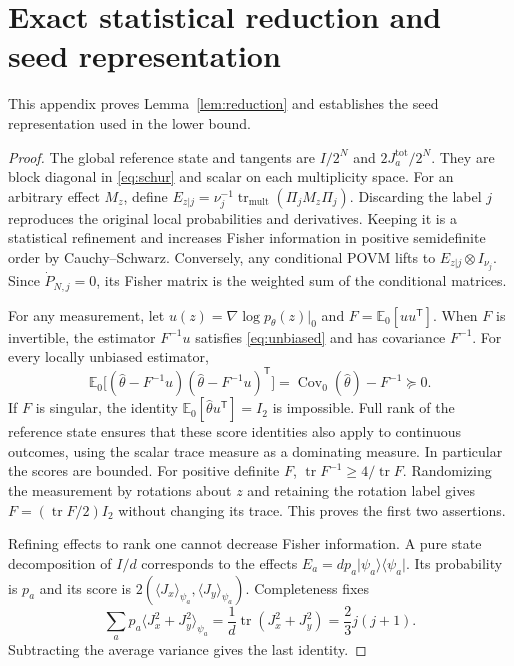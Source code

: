 \documentclass[aps,pra,reprint,superscriptaddress]{revtex4-2}
\theoremstyle{remark}
\DeclareMathOperator{\tr}{tr}
\DeclareMathOperator{\Cov}{Cov}
\newcommand{\E}{\mathbb E}
\newcommand{\ket}[1]{\lvert#1\rangle}
\newcommand{\bra}[1]{\langle#1\rvert}
\newcommand{\ip}[1]{\langle#1\rangle}
\begin{document}
\section{Exact statistical reduction and seed representation}
\label{app:reduction}
This appendix proves Lemma~\ref{lem:reduction} and establishes
the seed representation used in the lower bound.
\begin{proof}
The global reference state and tangents are $I/2^N$ and
$2J_a^{\mathrm{tot}}/2^N$. They are block diagonal in
\eqref{eq:schur} and scalar on each multiplicity space. For an
arbitrary effect $M_z$, define
$E_{z|j}=\nu_j^{-1}\tr_{\mathrm{mult}}(\Pi_jM_z\Pi_j)$.
Discarding the label $j$ reproduces the original local probabilities
and derivatives. Keeping it is a statistical refinement and increases
Fisher information in positive semidefinite order by
Cauchy--Schwarz. Conversely, any conditional POVM lifts to
$E_{z|j}\otimes I_{\nu_j}$. Since $\dot P_{N,j}=0$, its Fisher matrix
is the weighted sum of the conditional matrices.

For any measurement, let $u(z)=\nabla\log p_\theta(z)|_0$ and
$F=\E_0[uu^{\mathsf T}]$. When $F$ is invertible, the estimator
$F^{-1}u$ satisfies \eqref{eq:unbiased} and has covariance $F^{-1}$.
For every locally unbiased estimator,
\[
 \E_0\bigl[(\widehat\theta-F^{-1}u)
 (\widehat\theta-F^{-1}u)^{\mathsf T}\bigr]
 =\Cov_0(\widehat\theta)-F^{-1}\succeq0.
\]
If $F$ is singular, the identity
$\E_0[\widehat\theta u^{\mathsf T}]=I_2$ is impossible.
Full rank of the reference state ensures that these score identities
also apply to continuous outcomes, using the scalar trace measure as
a dominating measure. In particular the scores are bounded.
For positive definite $F$, $\tr F^{-1}\geq4/\tr F$.
Randomizing the measurement by rotations about $z$ and retaining the
rotation label gives $F=(\tr F/2)I_2$ without changing its trace.
This proves the first two assertions.

Refining effects to rank one cannot decrease Fisher information.
A pure state decomposition of $I/d$ corresponds to the effects
$E_a=dp_a\ket{\psi_a}\bra{\psi_a}$. Its probability is $p_a$ and its
score is $2(\ip{J_x}_{\psi_a},\ip{J_y}_{\psi_a})$. Completeness fixes
\[
 \sum_a p_a\ip{J_x^2+J_y^2}_{\psi_a}
 =\frac1d\tr(J_x^2+J_y^2)=\frac23j(j+1).
\]
Subtracting the average variance gives the last identity.
\end{proof}
\end{document}

